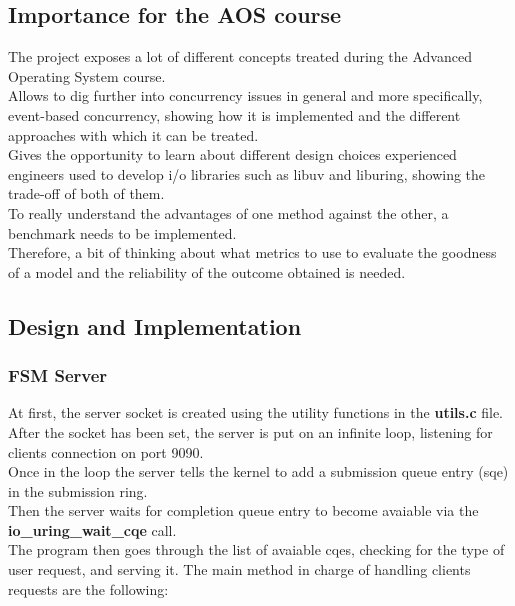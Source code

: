 \documentclass[10pt, oneside,english]{article}   	%
\begin{document}
\subsection{Importance for the AOS course}

The project exposes a lot of different concepts treated during the Advanced Operating System course. \\
Allows to dig further into concurrency issues in general and more specifically, event-based concurrency, showing how it is implemented and the different approaches with which it can be treated. \\
Gives the opportunity to learn about different design choices experienced engineers used to develop i/o libraries such as libuv and liburing, showing the trade-off of both of them. \\
To really understand the advantages of one method against the other, a benchmark needs to be implemented. \\
Therefore, a bit of thinking about what metrics to use to evaluate the goodness of a model and the reliability of the outcome obtained is needed.

\subsection{Design and Implementation}

\subsubsection{FSM Server}
At first, the server socket is created using the utility functions in the \textbf{utils.c} file. \\
After the socket has been set, the server is put on an infinite loop, listening for clients connection on port 9090. \\
Once in the loop the server tells the kernel to add a submission queue entry (sqe) in the submission ring. \\
Then the server waits for completion queue entry to become avaiable via the \textbf{io\_uring\_wait\_cqe} call. \\
The program then goes through the list of avaiable cqes, checking for the type of user request, and serving it.
The main method in charge of handling clients requests are the following:
\end{document}
